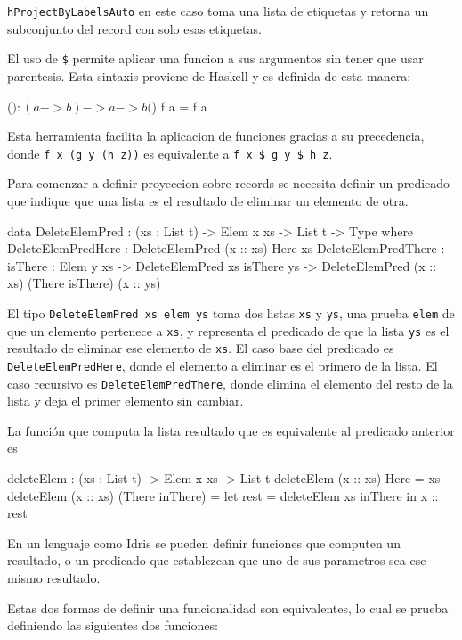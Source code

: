 \texttt{hProjectByLabelsAuto} en este caso toma una lista de etiquetas y retorna un subconjunto del record con solo esas etiquetas. 

El uso de \texttt{\$} permite aplicar una funcion a sus argumentos sin tener que usar parentesis. Esta sintaxis proviene de Haskell y es definida de esta manera:

\begin{code}
($) : (a -> b) -> a -> b
($) f a = f a
\end{code}

Esta herramienta facilita la aplicacion de funciones gracias a su precedencia, donde \texttt{f x (g y (h z))} es equivalente a \texttt{f x \$ g y \$ h z}.

Para comenzar a definir proyeccion sobre records se necesita definir un predicado que indique que una lista es el resultado de eliminar un elemento de otra.

\begin{code}
data DeleteElemPred : (xs : List t) -> Elem x xs -> 
  List t -> Type where
  DeleteElemPredHere : DeleteElemPred (x :: xs) Here xs
  DeleteElemPredThere : {isThere : Elem y xs} -> 
    DeleteElemPred xs isThere ys -> 
    DeleteElemPred (x :: xs) (There isThere) (x :: ys)
\end{code}

El tipo \texttt{DeleteElemPred xs elem ys} toma dos listas \texttt{xs} y \texttt{ys}, una prueba \texttt{elem} de que un elemento pertenece a \texttt{xs}, y representa el predicado de que la lista \texttt{ys} es el resultado de eliminar ese elemento de \texttt{xs}.
El caso base del predicado es \texttt{DeleteElemPredHere}, donde el elemento a eliminar es el primero de la lista.
El caso recursivo es \texttt{DeleteElemPredThere}, donde elimina el elemento del resto de la lista y deja el primer elemento sin cambiar.

La función que computa la lista resultado que es equivalente al predicado anterior es

\begin{code}
deleteElem : (xs : List t) -> Elem x xs -> List t
deleteElem (x :: xs) Here = xs
deleteElem (x :: xs) (There inThere) =
  let rest = deleteElem xs inThere
  in x :: rest  
\end{code}

En un lenguaje como Idris se pueden definir funciones que computen un resultado, o un predicado que establezcan que uno de sus parametros sea ese mismo resultado. 

Estas dos formas de definir una funcionalidad son equivalentes, lo cual se prueba definiendo las siguientes dos funciones:


